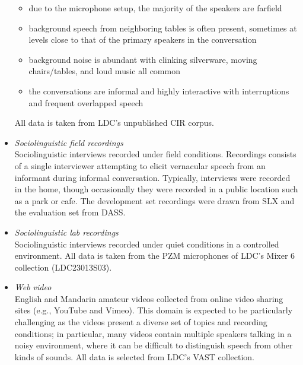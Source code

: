 \documentclass{article}
\begin{document}
\begin{appendices}
\begin{itemize}
                \begin{itemize}
                    \item due to the microphone setup, the majority of the speakers are farfield
                    \item background speech from neighboring tables is often present, sometimes at levels close to that of the primary speakers in the conversation
                    \item background noise is abundant with clinking silverware, moving chairs/tables, and loud music all common
                    \item the conversations are informal and highly interactive with interruptions and frequent overlapped speech
                \end{itemize}
            All data is taken from LDC's unpublished CIR corpus.
        \item {\it Sociolinguistic field recordings} \\
           Sociolinguistic interviews recorded under field conditions. Recordings consists of a single interviewer attempting to elicit vernacular speech from an informant during informal conversation. Typically, interviews were recorded in the home, though occasionally they were recorded in a public location such as a park or cafe. The development set recordings were drawn from SLX and the evaluation set from DASS.
        \item {\it Sociolinguistic lab recordings} \\
            Sociolinguistic interviews recorded under quiet conditions in a controlled environment. All data is taken from the PZM microphones of LDC's Mixer 6 collection (LDC23013S03).
        \item {\it Web video} \\
            English and Mandarin amateur videos collected from online video sharing sites  (e.g., YouTube and Vimeo). This domain is expected to be particularly challenging as the videos present a diverse set of topics and recording conditions; in particular,  many videos contain multiple speakers talking in a noisy environment, where it can be difficult to distinguish speech from other kinds of sounds. All data is selected from LDC's VAST collection.
    \end{itemize}



\end{appendices}
\end{document}
